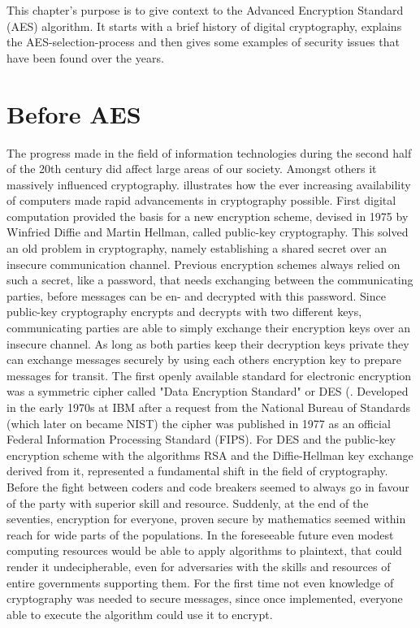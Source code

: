 This chapter's purpose is to give context to the Advanced Encryption Standard (AES) algorithm. It starts with a brief history of digital cryptography, explains the AES-selection-process and then gives some examples of security issues that have been found over the years.


\section{Before AES}
\label{ch:before-aes}
The progress made in the field of information technologies during the second half of the 20th century did affect large areas of our society. Amongst others it massively influenced cryptography. \cite{cryptorebels} illustrates how the ever increasing availability of computers made rapid advancements in cryptography possible. First digital computation provided the basis for a new encryption scheme, devised in 1975 by Winfried Diffie and Martin Hellman, called public-key cryptography. This solved an old problem in cryptography, namely establishing a shared secret over an insecure communication channel. Previous encryption schemes always relied on such a secret, like a password, that needs exchanging between the communicating parties, before messages can be en- and decrypted with this password. Since public-key cryptography encrypts and decrypts with two different keys, communicating parties are able to simply exchange their encryption keys over an insecure channel. As long as both parties keep their decryption keys private they can exchange messages securely by using each others encryption key to prepare messages for transit.
The first openly available standard for electronic encryption was a symmetric cipher called "Data Encryption Standard" or DES (\cite[p. 105]{appcrypt}. Developed in the early 1970s at IBM after a request from the National Bureau of Standards (which later on became NIST) the cipher was published in 1977 as an official Federal Information Processing Standard (FIPS). For \cite[p. 2]{cryptodream} DES and the public-key encryption scheme with the algorithms RSA and the Diffie-Hellman key exchange derived from it, represented a fundamental shift in the field of cryptography. Before the fight between coders and code breakers seemed to always go in favour of the party with superior skill and resource. Suddenly, at the end of the seventies, encryption for everyone, proven secure by mathematics seemed within reach for wide parts of the populations. In the foreseeable future even modest computing resources would be able to apply algorithms to plaintext, that could render it undecipherable, even for adversaries with the skills and resources of entire governments supporting them. For the first time not even knowledge of cryptography was needed to secure messages, since once implemented, everyone able to execute the algorithm could use it to encrypt.

